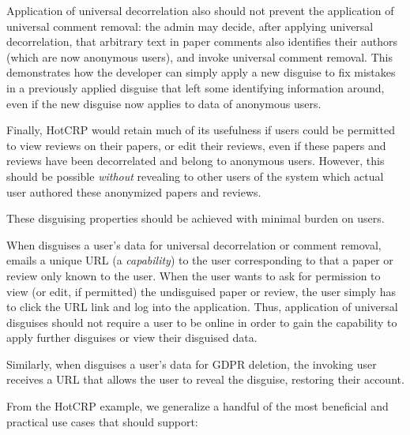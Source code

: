 Application of universal decorrelation also should not prevent the application of universal comment
removal: the admin may decide, after applying universal decorrelation, that arbitrary text in paper
comments also identifies their authors (which are now anonymous users), and invoke universal comment
removal. 
%
This demonstrates how the developer can simply apply a new disguise to fix mistakes in a previously
applied disguise that left some identifying information around, even if the new disguise now applies to
data of anonymous users.

Finally, HotCRP would retain much of its usefulness if users could be permitted to view reviews on
their papers, or edit their reviews, even if these papers and reviews have been decorrelated and
belong to anonymous users.  However, this should be possible \emph{without} revealing to other users
of the system which actual user authored these anonymized papers and reviews.

 These disguising properties should be achieved with minimal burden on
users. 

When \sys disguises a user's data for universal decorrelation or comment removal, \sys emails a
unique URL (a \emph{capability}) to the user corresponding to that a paper or review only known to
the user. When the user wants to ask for permission to view (or edit, if permitted) the undisguised
paper or review, the user simply has to click the URL link and log into the application. Thus,
application of universal disguises should not require a user to be online in order to gain the
capability to apply further disguises or view their disguised data.

Similarly, when \sys disguises a user's data for GDPR deletion, the invoking user receives a URL
that allows the user to reveal the disguise, restoring their account.

From the HotCRP example, we generalize a handful of the most beneficial and practical use cases
that \sys should support:

